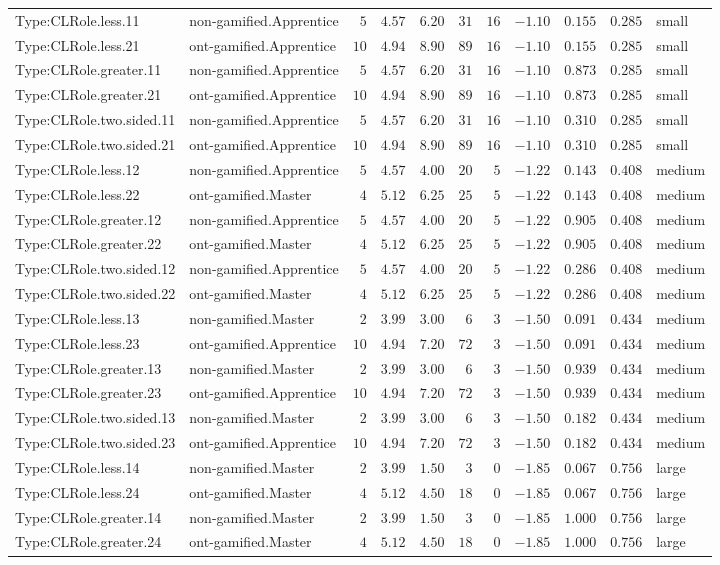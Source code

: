 \documentclass[6pt,a4paper]{article}
\begin{document}
{\begin{longtable}{llrrrrrrrrl}
Type:CLRole.less.11&non-gamified.Apprentice&$ 5$&$4.57$&$ 6.20$&$ 31$&$16$&$-1.10$&$0.155$&$0.285$&small\tabularnewline
Type:CLRole.less.21&ont-gamified.Apprentice&$10$&$4.94$&$ 8.90$&$ 89$&$16$&$-1.10$&$0.155$&$0.285$&small\tabularnewline
Type:CLRole.greater.11&non-gamified.Apprentice&$ 5$&$4.57$&$ 6.20$&$ 31$&$16$&$-1.10$&$0.873$&$0.285$&small\tabularnewline
Type:CLRole.greater.21&ont-gamified.Apprentice&$10$&$4.94$&$ 8.90$&$ 89$&$16$&$-1.10$&$0.873$&$0.285$&small\tabularnewline
Type:CLRole.two.sided.11&non-gamified.Apprentice&$ 5$&$4.57$&$ 6.20$&$ 31$&$16$&$-1.10$&$0.310$&$0.285$&small\tabularnewline
Type:CLRole.two.sided.21&ont-gamified.Apprentice&$10$&$4.94$&$ 8.90$&$ 89$&$16$&$-1.10$&$0.310$&$0.285$&small\tabularnewline
Type:CLRole.less.12&non-gamified.Apprentice&$ 5$&$4.57$&$ 4.00$&$ 20$&$ 5$&$-1.22$&$0.143$&$0.408$&medium\tabularnewline
Type:CLRole.less.22&ont-gamified.Master&$ 4$&$5.12$&$ 6.25$&$ 25$&$ 5$&$-1.22$&$0.143$&$0.408$&medium\tabularnewline
Type:CLRole.greater.12&non-gamified.Apprentice&$ 5$&$4.57$&$ 4.00$&$ 20$&$ 5$&$-1.22$&$0.905$&$0.408$&medium\tabularnewline
Type:CLRole.greater.22&ont-gamified.Master&$ 4$&$5.12$&$ 6.25$&$ 25$&$ 5$&$-1.22$&$0.905$&$0.408$&medium\tabularnewline
Type:CLRole.two.sided.12&non-gamified.Apprentice&$ 5$&$4.57$&$ 4.00$&$ 20$&$ 5$&$-1.22$&$0.286$&$0.408$&medium\tabularnewline
Type:CLRole.two.sided.22&ont-gamified.Master&$ 4$&$5.12$&$ 6.25$&$ 25$&$ 5$&$-1.22$&$0.286$&$0.408$&medium\tabularnewline
Type:CLRole.less.13&non-gamified.Master&$ 2$&$3.99$&$ 3.00$&$  6$&$ 3$&$-1.50$&$0.091$&$0.434$&medium\tabularnewline
Type:CLRole.less.23&ont-gamified.Apprentice&$10$&$4.94$&$ 7.20$&$ 72$&$ 3$&$-1.50$&$0.091$&$0.434$&medium\tabularnewline
Type:CLRole.greater.13&non-gamified.Master&$ 2$&$3.99$&$ 3.00$&$  6$&$ 3$&$-1.50$&$0.939$&$0.434$&medium\tabularnewline
Type:CLRole.greater.23&ont-gamified.Apprentice&$10$&$4.94$&$ 7.20$&$ 72$&$ 3$&$-1.50$&$0.939$&$0.434$&medium\tabularnewline
Type:CLRole.two.sided.13&non-gamified.Master&$ 2$&$3.99$&$ 3.00$&$  6$&$ 3$&$-1.50$&$0.182$&$0.434$&medium\tabularnewline
Type:CLRole.two.sided.23&ont-gamified.Apprentice&$10$&$4.94$&$ 7.20$&$ 72$&$ 3$&$-1.50$&$0.182$&$0.434$&medium\tabularnewline
Type:CLRole.less.14&non-gamified.Master&$ 2$&$3.99$&$ 1.50$&$  3$&$ 0$&$-1.85$&$0.067$&$0.756$&large\tabularnewline
Type:CLRole.less.24&ont-gamified.Master&$ 4$&$5.12$&$ 4.50$&$ 18$&$ 0$&$-1.85$&$0.067$&$0.756$&large\tabularnewline
Type:CLRole.greater.14&non-gamified.Master&$ 2$&$3.99$&$ 1.50$&$  3$&$ 0$&$-1.85$&$1.000$&$0.756$&large\tabularnewline
Type:CLRole.greater.24&ont-gamified.Master&$ 4$&$5.12$&$ 4.50$&$ 18$&$ 0$&$-1.85$&$1.000$&$0.756$&large\tabularnewline

\end{longtable}}
\end{document}
